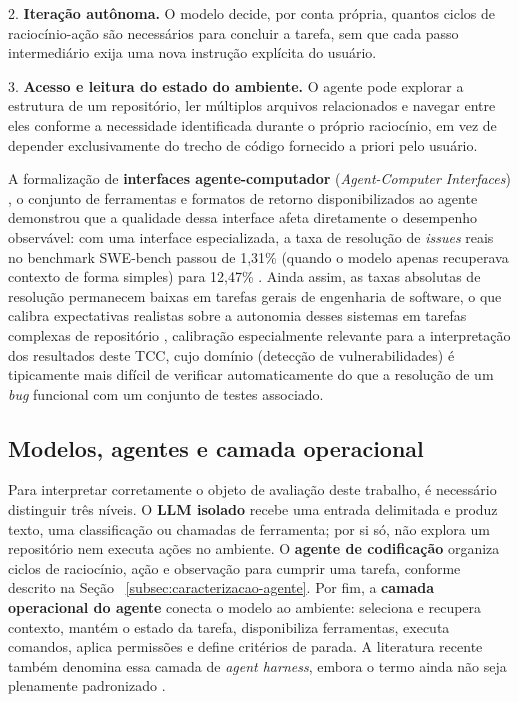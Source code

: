 2. \textbf{Iteração autônoma.} O modelo decide, por conta própria, quantos ciclos de raciocínio-ação são necessários para concluir a tarefa, sem que cada passo intermediário exija uma nova instrução explícita do usuário.

3. \textbf{Acesso e leitura do estado do ambiente.} O agente pode explorar a estrutura de um repositório, ler múltiplos arquivos relacionados e navegar entre eles conforme a necessidade identificada durante o próprio raciocínio, em vez de depender exclusivamente do trecho de código fornecido a priori pelo usuário.

A formalização de \textbf{interfaces agente-computador} (\textit{Agent-Computer Interfaces}) , o conjunto de ferramentas e formatos de retorno disponibilizados ao agente demonstrou que a qualidade dessa interface afeta diretamente o desempenho observável: com uma interface especializada, a taxa de resolução de \textit{issues} reais no benchmark SWE-bench passou de 1,31\% (quando o modelo apenas recuperava contexto de forma simples) para 12,47\% \cite{Yang2024SWEagent, Jimenez2024SWEbench}. Ainda assim, as taxas absolutas de resolução permanecem baixas em tarefas gerais de engenharia de software, o que calibra expectativas realistas sobre a autonomia desses sistemas em tarefas complexas de repositório \cite{Jimenez2024SWEbench} , calibração especialmente relevante para a interpretação dos resultados deste TCC, cujo domínio (detecção de vulnerabilidades) é tipicamente mais difícil de verificar automaticamente do que a resolução de um \textit{bug} funcional com um conjunto de testes associado.

\subsection{Modelos, agentes e camada operacional}\label{subsec:camada-operacional-agente}
Para interpretar corretamente o objeto de avaliação deste trabalho, é necessário distinguir três níveis. O \textbf{LLM isolado} recebe uma entrada delimitada e produz texto, uma classificação ou chamadas de ferramenta; por si só, não explora um repositório nem executa ações no ambiente. O \textbf{agente de codificação} organiza ciclos de raciocínio, ação e observação para cumprir uma tarefa, conforme descrito na Seção ~\ref{subsec:caracterizacao-agente}. Por fim, a \textbf{camada operacional do agente} conecta o modelo ao ambiente: seleciona e recupera contexto, mantém o estado da tarefa, disponibiliza ferramentas, executa comandos, aplica permissões e define critérios de parada. A literatura recente também denomina essa camada de \textit{agent harness}, embora o termo ainda não seja plenamente padronizado \cite{Yang2024SWEagent, Macedo2026AgentHarness}.

